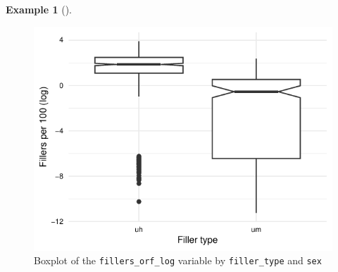 \documentclass[
  letterpaper,
]{latex/krantz}
\theoremstyle{definition}
\newtheorem{example}{Example}[chapter]
\theoremstyle{remark}
\begin{document}
\begin{example}[]
\begin{figure}[!htb]
\begin{minipage}{0.50\linewidth}
{\includegraphics{part_4/10_infer_files/figure-pdf/fig-infer-multi-sex-plot-1.pdf}

}


\end{minipage}%
%
\begin{minipage}{0.50\linewidth}



\end{minipage}%

\caption{\label{fig-infer-multi-sex-plot}Boxplot of the
\texttt{fillers\_orf\_log} variable by \texttt{filler\_type} and
\texttt{sex}}

\end{figure}%

\end{example}
\end{document}
